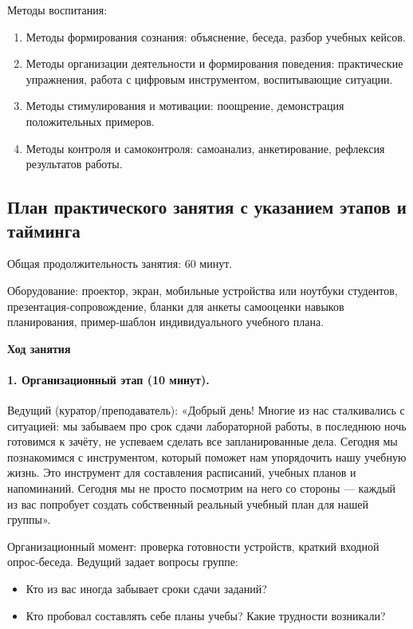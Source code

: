 \documentclass[14pt,a4paper]{article}
\begin{document}
Методы воспитания:
\begin{enumerate}
    \item Методы формирования сознания: объяснение, беседа, разбор учебных кейсов.
    \item Методы организации деятельности и формирования поведения: практические упражнения, работа с цифровым инструментом, воспитывающие ситуации.
    \item Методы стимулирования и мотивации: поощрение, демонстрация положительных примеров.
    \item Методы контроля и самоконтроля: самоанализ, анкетирование, рефлексия результатов работы.
\end{enumerate}


\subsection{План практического занятия с указанием этапов и тайминга}

Общая продолжительность занятия: 60 минут.

Оборудование: проектор, экран, мобильные устройства или ноутбуки студентов, презентация‑сопровождение, бланки для анкеты самооценки навыков планирования, пример‑шаблон индивидуального учебного плана.

\textbf{Ход занятия}

\paragraph{1. Организационный этап (10 минут).}
Ведущий (куратор/преподаватель): «Добрый день! Многие из нас сталкивались с ситуацией: мы забываем про срок сдачи лабораторной работы, в последнюю ночь готовимся к зачёту, не успеваем сделать все запланированные дела. Сегодня мы познакомимся с инструментом, который поможет нам упорядочить нашу учебную жизнь. Это инструмент для составления расписаний, учебных планов и напоминаний. Сегодня мы не просто посмотрим на него со стороны — каждый из вас попробует создать собственный реальный учебный план для нашей группы».

Организационный момент: проверка готовности устройств, краткий входной опрос‑беседа. Ведущий задает вопросы группе:
\begin{itemize}
    \item Кто из вас иногда забывает сроки сдачи заданий?
    \item Кто пробовал составлять себе планы учебы? Какие трудности возникали?
\end{itemize}
\end{document}
